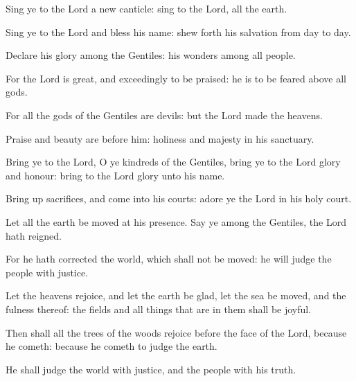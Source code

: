 ﻿\item Sing ye to the Lord a new canticle: sing to the Lord, all the earth.
\item Sing ye to the Lord and bless his name: shew forth his salvation from day to day.
\item Declare his glory among the Gentiles: his wonders among all people.
\item For the Lord is great, and exceedingly to be praised: he is to be feared above all gods.
\item For all the gods of the Gentiles are devils: but the Lord made the heavens.
\item Praise and beauty are before him: holiness and majesty in his sanctuary.
\item Bring ye to the Lord, O ye kindreds of the Gentiles, bring ye to the Lord glory and honour: bring to the Lord glory unto his name.
\item Bring up sacrifices, and come into his courts: adore ye the Lord in his holy court.
\item Let all the earth be moved at his presence. Say ye among the Gentiles, the Lord hath reigned.
\item For he hath corrected the world, which shall not be moved: he will judge the people with justice.
\item Let the heavens rejoice, and let the earth be glad, let the sea be moved, and the fulness thereof: the fields and all things that are in them shall be joyful.
\item Then shall all the trees of the woods rejoice before the face of the Lord, because he cometh: because he cometh to judge the earth.
\item He shall judge the world with justice, and the people with his truth.
